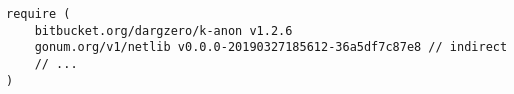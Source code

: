 \begin{lstlisting}[caption=The \texttt{go.mod} file,label=lst:go_mod,float,floatplacement=H]
require (
    bitbucket.org/dargzero/k-anon v1.2.6
    gonum.org/v1/netlib v0.0.0-20190327185612-36a5df7c87e8 // indirect
    // ...
)
\end{lstlisting}